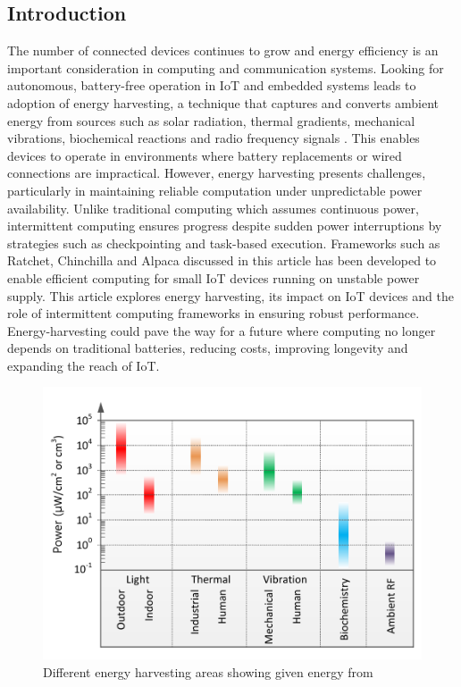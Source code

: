 \documentclass[article,a4paper]{IEEEtran}
\begin{document}
\subsection{Introduction}
The number of connected devices continues to grow and energy efficiency is an important consideration in computing and communication systems. Looking for autonomous, battery-free operation in IoT and embedded systems leads to adoption of energy harvesting, a technique that captures and converts ambient energy from sources such as solar radiation, thermal gradients, mechanical vibrations, biochemical reactions and radio frequency signals \cite{Energyharvest1}. This enables devices to operate in environments where battery replacements or wired connections are impractical. 
\newline\newline
However, energy harvesting presents challenges, particularly in maintaining reliable computation under unpredictable power availability. Unlike traditional computing which assumes continuous power, intermittent computing ensures progress despite sudden power interruptions by strategies such as checkpointing and task-based execution. Frameworks such as Ratchet, Chinchilla and Alpaca discussed in this article has been developed to enable efficient computing for small IoT devices running on unstable power supply.  
\newline\newline
This article explores energy harvesting, its impact on IoT devices and the role of intermittent computing frameworks in ensuring robust performance. Energy-harvesting could pave the way for a future where computing no longer depends on traditional batteries, reducing costs, improving longevity and expanding the reach of IoT. 
\begin{figure}
    \includegraphics[width=\columnwidth]{EnergyHarvest1.png}
    \caption{ Different energy harvesting areas showing given energy from \cite{Energyharvest1} }
    \label{fig2_Energy_harvest}
\end{figure}
\end{document}
